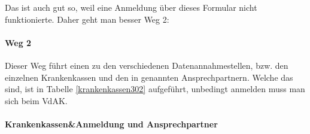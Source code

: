Das ist auch gut so, weil eine Anmeldung über dieses Formular nicht 
funktionierte. Daher geht man besser Weg 2:

\paragraph{Weg 2}
Dieser Weg führt einen zu den verschiedenen Datenannahmestellen, bzw.
den einzelnen Krankenkassen und den in \cite{datenaustausch302} genannten
Ansprechpartnern. Welche das sind, ist in Tabelle \ref{krankenkassen302}
aufgeführt, unbedingt anmelden muss man sich beim VdAK.

\paragraph{}

\tablehead
{\hline \bfseries Krankenkassen&\bfseries Anmeldung und Ansprechpartner\\ \hline}

\tabletail
{\hline {}\\}

